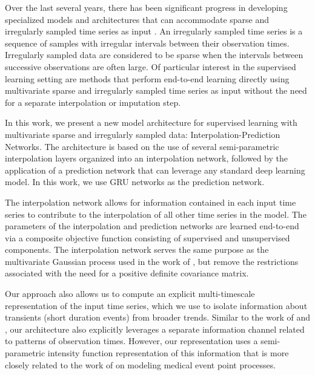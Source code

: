 \documentclass{article} \usepackage{iclr2019_conference,times}
\begin{document}
Over the last several years, there has been significant progress 
in developing specialized models and architectures that can
accommodate sparse and irregularly sampled time series
as input \citep{marlin-ihi2012, li2015classification, li2016scalable, lipton2016directly,  futoma2017improved, che2016recurrent}. 
An irregularly sampled time series 
is a sequence of samples with irregular intervals between their observation times.
Irregularly sampled data are considered to be sparse when the intervals
between successive observations are often large.
Of particular interest in the supervised learning setting are 
methods that perform end-to-end learning directly using 
multivariate sparse and irregularly sampled time series as input without
the need for a separate interpolation or imputation step. 

In this work, we present a new model architecture for
supervised learning with multivariate sparse and irregularly sampled data: 
Interpolation-Prediction Networks. 
The architecture is based on the use of several semi-parametric interpolation layers
organized into an interpolation network, followed by the 
application of a prediction network that can leverage any standard deep learning model.
In this work, we use GRU networks \citep{gru} as the prediction
network.

The interpolation network allows for information contained in each input time series
to contribute to the interpolation of all other time series
in the model. The parameters of the interpolation and prediction networks
are learned end-to-end via a composite objective function consisting 
of supervised and unsupervised components. The interpolation network serves 
the same purpose as the multivariate Gaussian process used in 
the work of \citet{futoma2017improved}, but remove the restrictions 
associated with the need for a positive definite covariance matrix. 

Our approach also allows us to compute an explicit multi-timescale representation
of the input time series, which we use to isolate information
about transients (short duration events) from broader trends.  
Similar to the work of \citet{lipton2016directly} and  \citet{che2016recurrent},
our architecture also explicitly leverages a separate information
channel related to patterns of observation times. However, our
representation uses a semi-parametric intensity function representation
of this information that is more closely related to the work of \citet{lasko2014efficient}
on modeling medical event point processes.
\end{document}
